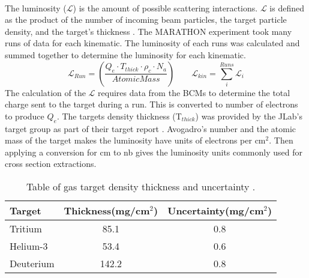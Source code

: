\paragraph{} The luminosity ($\mathscr{L}$) is the amount of possible scattering interactions. $\mathscr{L}$ is defined as the product of the number of incoming beam particles, the target particle density, and the target's thickness \cite{PnN}. The MARATHON experiment took many runs of data for each kinematic. The luminosity of each runs was calculated and summed together to determine the luminosity for each kinematic. 
\begin{equation}
	\mathscr{L}_{Run} =  \left(\frac{Q_e \cdot T_{thick} \cdot \rho_c \cdot N_a}{AtomicMass} \right) \qquad
	\mathscr{L}_{kin} = \sum_i^{Runs} \mathscr{L}_{i}
\end{equation}
The calculation of the $\mathscr{L}$ requires data from the BCMs to determine the total charge sent to the target during a run. This is converted to number of electrons to produce $Q_e$. The targets density thickness (T$_{thick}$) was provided by the JLab's target group as part of their target report \cite{HATT_eng}. Avogadro's number and the atomic mass of the target makes the luminosity have units of electrons per cm$^2$. Then applying a conversion for cm to nb gives the luminosity units commonly used for cross section extractions.
\begin{table}[]
	\caption{Table of gas target density thickness and uncertainty \cite{HATT_eng}. \label{tgt_table}}
	\centering
	\begin{tabular}{lcc}
	Target &Thickness(mg/cm$^2$) & Uncertainty(mg/cm$^2$)   \\
	\hline
	Tritium & 85.1 & 0.8 \\
	Helium-3 & 53.4 & 0.6\\
	Deuterium & 142.2 & 0.8\\
	\hline
	\end{tabular}
\end{table}
